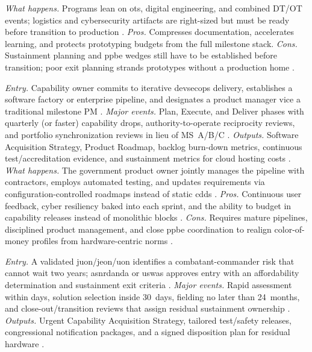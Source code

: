 \documentclass[../main.tex]{subfiles}
\begin{document}
\begin{description}[style=nextline,labelsep=0.5em,font=\bfseries]
        \textit{What happens.} Programs lean on \acp{ot}, digital engineering, and combined DT/OT events; logistics and cybersecurity artifacts are right-sized but must be ready before transition to production \autocite{DoDI5000-80}.
        \textit{Pros.} Compresses documentation, accelerates learning, and protects prototyping budgets from the full milestone stack.
        \textit{Cons.} Sustainment planning and \ac{ppbe} wedges still have to be established before transition; poor exit planning strands prototypes without a production home \autocite{DoDI5000-80}.
  \item[Software Acquisition Pathway.]
        \textit{Entry.} Capability owner commits to iterative \ac{devsecops} delivery, establishes a software factory or enterprise pipeline, and designates a product manager vice a traditional milestone PM \autocite{DoDI5000-87}.
        \textit{Major events.} Plan, Execute, and Deliver phases with quarterly (or faster) capability drops, authority-to-operate reciprocity reviews, and portfolio synchronization reviews in lieu of MS~A/B/C \autocite{DoDI5000-87}.
        \textit{Outputs.} Software Acquisition Strategy, Product Roadmap, backlog burn-down metrics, continuous test/accreditation evidence, and sustainment metrics for cloud hosting costs \autocite{DoDI5000-87}.
        \textit{What happens.} The government product owner jointly manages the pipeline with contractors, employs automated testing, and updates requirements via configuration-controlled roadmaps instead of static \acp{cdd} \autocite{DoDI5000-87}.
        \textit{Pros.} Continuous user feedback, cyber resiliency baked into each sprint, and the ability to budget in capability releases instead of monolithic blocks \autocite{DoDI5000-87}.
        \textit{Cons.} Requires mature pipelines, disciplined product management, and close \ac{ppbe} coordination to realign color-of-money profiles from hardware-centric norms \autocite{DoDI5000-87}.
  \item[Urgent Capability Acquisition.]
        \textit{Entry.} A validated \ac{juon}/\ac{jeon}/\ac{uon} identifies a combatant-commander risk that cannot wait two years; \ac{asnrdanda} or \ac{uswas} approves entry with an affordability determination and sustainment exit criteria \autocite{CJCSI3470-01H,DoDI5000-81}.
        \textit{Major events.} Rapid assessment within days, solution selection inside 30~days, fielding no later than 24~months, and close-out/transition reviews that assign residual sustainment ownership \autocite{DoDI5000-81}.
        \textit{Outputs.} Urgent Capability Acquisition Strategy, tailored test/safety releases, congressional notification packages, and a signed disposition plan for residual hardware \autocite{DoDI5000-81}.

\end{description}
\end{document}

